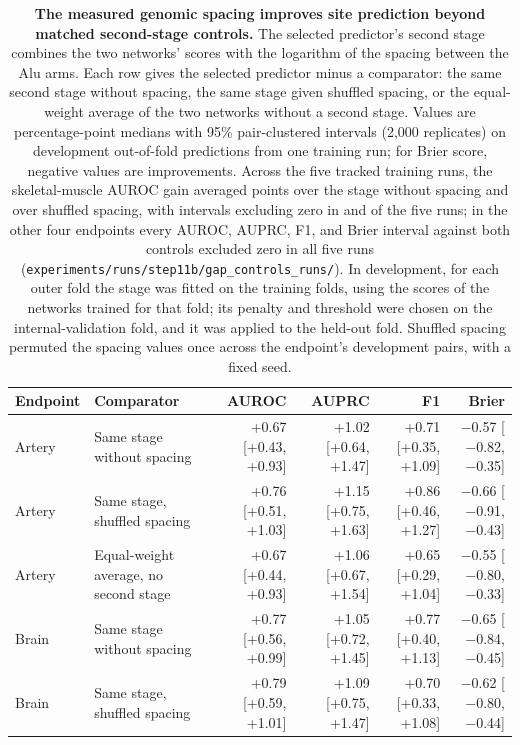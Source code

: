 \begin{table}[H]
\centering
\footnotesize
\caption{\textbf{The measured genomic spacing improves site prediction beyond matched second-stage controls.} The selected predictor's second stage combines the two networks' scores with the logarithm of the spacing between the Alu arms. Each row gives the selected predictor minus a comparator: the same second stage without spacing, the same stage given shuffled spacing, or the equal-weight average of the two networks without a second stage. Values are percentage-point medians with 95\% pair-clustered intervals (2,000 replicates) on development out-of-fold predictions from one training run; for Brier score, negative values are improvements. Across the five tracked training runs, the skeletal-muscle AUROC gain averaged \GapRunsMuscleVsNoGapAUROCMean{} points over the stage without spacing and \GapRunsMuscleVsShuffledAUROCMean{} over shuffled spacing, with intervals excluding zero in \GapRunsMuscleVsNoGapAUROCExcl{} and \GapRunsMuscleVsShuffledAUROCExcl{} of the five runs; in the other four endpoints every AUROC, AUPRC, F1, and Brier interval against both controls excluded zero in all five runs (\texttt{experiments/runs/step11b/gap\_controls\_runs/}). In development, for each outer fold the stage was fitted on the training folds, using the scores of the networks trained for that fold; its penalty and threshold were chosen on the internal-validation fold, and it was applied to the held-out fold. Shuffled spacing permuted the spacing values once across the endpoint's development pairs, with a fixed seed.}\label{tab:gapcontrols}
\begin{tabular}{llrrrr}
\toprule
Endpoint & Comparator & AUROC & AUPRC & F1 & Brier \\
\midrule
Artery & Same stage without spacing & +0.67 [+0.43, +0.93] & +1.02 [+0.64, +1.47] & +0.71 [+0.35, +1.09] & $-$0.57 [$-$0.82, $-$0.35] \\
Artery & Same stage, shuffled spacing & +0.76 [+0.51, +1.03] & +1.15 [+0.75, +1.63] & +0.86 [+0.46, +1.27] & $-$0.66 [$-$0.91, $-$0.43] \\
Artery & Equal-weight average, no second stage & +0.67 [+0.44, +0.93] & +1.06 [+0.67, +1.54] & +0.65 [+0.29, +1.04] & $-$0.55 [$-$0.80, $-$0.33] \\
Brain & Same stage without spacing & +0.77 [+0.56, +0.99] & +1.05 [+0.72, +1.45] & +0.77 [+0.40, +1.13] & $-$0.65 [$-$0.84, $-$0.45] \\
Brain & Same stage, shuffled spacing & +0.79 [+0.59, +1.01] & +1.09 [+0.75, +1.47] & +0.70 [+0.33, +1.08] & $-$0.62 [$-$0.80, $-$0.44] \\

\end{tabular}
\end{table}
